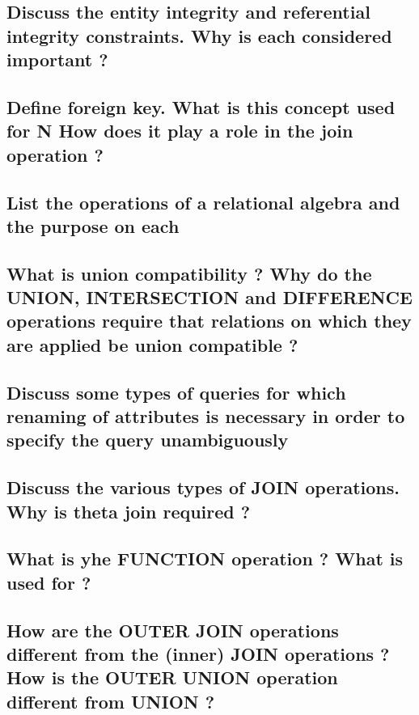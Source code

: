 \subsection{Discuss the entity integrity and referential integrity constraints. Why is each considered important ?}

\subsection{Define foreign key. What is this concept used for N How does it play a role in the join operation ?}

\subsection{List the operations of a relational algebra and the purpose on each}

\subsection{What is union compatibility ? Why do the UNION, INTERSECTION and DIFFERENCE operations require that relations on which they are applied be union compatible ?}

\subsection{Discuss some types of queries for which renaming of attributes is necessary in order to specify the query unambiguously}

\subsection{Discuss the various types of JOIN operations. Why is theta join required ?}

\subsection{What is yhe FUNCTION operation ? What is used for ?}

\subsection{How are the OUTER JOIN operations different from the (inner) JOIN operations ? How is the OUTER UNION operation different from UNION ?}